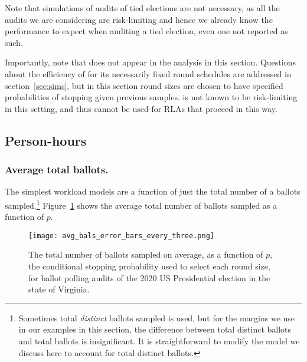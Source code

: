 Note that simulations of audits of tied elections are not necessary, as all the audits we are considering are risk-limiting and hence we already know the performance to expect when auditing a tied election, even one not reported as such. 

Importantly, note that \Minerva does not appear in the analysis in this section. 
Questions about the efficiency of \Minerva for its necessarily fixed round schedules are addressed in section~\ref{sec:sims}, but in this section round sizes are chosen to have specified probabilities of stopping given previous samples. \Minerva is not known to be risk-limiting in this setting, and thus cannot be used for RLAs that proceed in this way.

\subsection{Person-hours}

\subsubsection{Average total ballots.} 
The simplest workload models are a function of just the total number of a ballots sampled.\footnote{Sometimes total \emph{distinct} ballots sampled is used, but for the margins we use in our examples in this section, the difference between total distinct ballots and total ballots is insignificant\cite{arxiv_athena}. It is straightforward to modify the model we discuss here to account for total distinct ballots.} Figure~\ref{fig:avg_bals} shows the average total number of ballots sampled as a function of $p$.
\begin{figure}[h!]
\texttt{[image: avg\_bals\_error\_bars\_every\_three.png]}
\caption{The total number of ballots sampled on average, as a function of $p$, the conditional stopping probability used to select each round size, for ballot polling audits of the 2020 US Presidential election in the state of Virginia.}
\label{fig:avg_bals}
\end{figure}

